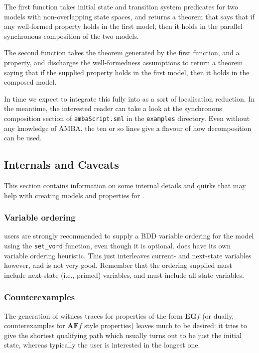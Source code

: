 The first function takes initial state and transition system predicates for two models with non-overlapping state spaces, and returns a theorem that says that if any well-formed property holds in the first model, then it holds in the parallel synchronous composition of the two models.

The second function takes the theorem generated by the first function, and a property, and discharges the well-formedness assumptions to return a theorem saying that if the supplied property holds in the first model, then it holds in the composed model.

In time we expect to integrate this fully into \hc{} as a sort of localisation reduction. In the meantime, the interested reader can take a look at the synchronous composition section of \texttt{ambaScript.sml} in the \texttt{examples} directory. Even without any knowledge of AMBA, the ten or so lines give a flavour of how decomposition can be used.

\subsection{\hc{} Internals and Caveats}

This section contains information on some internal details and quirks that may help with creating models and properties for \hc{}.

\subsubsection{Variable ordering}

\hc{} users are strongly recommended to supply a BDD variable ordering for the model using the \texttt{set\_vord} function, even though it is optional. \hc{} does have its own variable ordering heuristic. This just interleaves current- and next-state variables however, and is not very good. Remember that the ordering supplied must include next-state (i.e., primed) variables, and must include all state variables.

\subsubsection{Counterexamples}

The generation of witness traces for properties of the form \(\mathbf{EG} f \) (or dually, counterexamples for \(\mathbf{AF} f \) style properties) leaves much to be desired: it tries to give the shortest qualifying path which usually turns out to be just the initial state, whereas typically the user is interested in the longest one.

